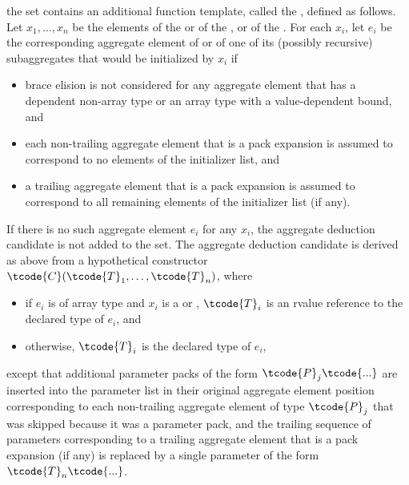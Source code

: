 the set contains an additional function template,
called the , defined as follows.
Let $x_1, \dotsc, x_n$ be the elements
of the  or
of the , or
of the .
For each $x_i$, let $e_i$ be the corresponding aggregate element
of  or of one of its (possibly recursive) subaggregates
that would be initialized by $x_i$ if
\begin{itemize}
\item
brace elision is not considered for any aggregate element
that has a dependent non-array type or
an array type with a value-dependent bound, and
\item
each non-trailing aggregate element that is a pack expansion
is assumed to correspond to no elements of the initializer list, and
\item
a trailing aggregate element that is a pack expansion is assumed to correspond
to all remaining elements of the initializer list (if any).
\end{itemize}
If there is no such aggregate element $e_i$ for any $x_i$,
the aggregate deduction candidate is not added to the set.
The aggregate deduction candidate is derived as above
from a hypothetical constructor $\tcode{C}(\tcode{T}_1, \dotsc, \tcode{T}_n)$,
where
\begin{itemize}
\item
if $e_i$ is of array type and
$x_i$ is a  or ,
$\tcode{T}_i$ is an rvalue reference to the declared type of $e_i$, and
\item
otherwise, $\tcode{T}_i$ is the declared type of $e_i$,
\end{itemize}
except that additional parameter packs of the form $\tcode{P}_j \tcode{...}$
are inserted into the parameter list in their original aggregate element position corresponding to each non-trailing aggregate element of type $\tcode{P}_j$
that was skipped because it was a parameter pack, and
the trailing sequence of parameters corresponding
to a trailing aggregate element that is a pack expansion (if any)
is replaced by a single parameter of the form $\tcode{T}_n \tcode{...}$.

